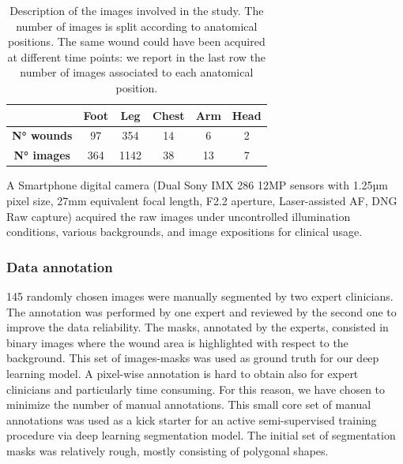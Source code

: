 \documentclass[../main.tex]{subfiles}
\begin{document}
\begin{table}[!ht]
    \centering
    \begin{tabular}{c|c|c|c|c|c|}
  
        \textbf{} & \textbf{Foot} & \textbf{Leg} & \textbf{Chest} & \textbf{Arm} & \textbf{Head} \\ \hline
        \textbf{N° wounds} & 97 & 354 & 14 & 6 & 2 \\ 
        \textbf{N° images} & 364 & 1142 & 38 & 13 & 7 \\ \hline
    \end{tabular}
    \caption{Description of the images involved in the study. The number of images is split according to anatomical positions. The same wound could have been acquired at different time points: we report in the last row the number of images associated to each anatomical position.}
    \label{tab:wounds-deepsk}
\end{table}
A Smartphone digital camera (Dual Sony IMX 286 12MP sensors with 1.25µm pixel size, 27mm equivalent focal length, F2.2 aperture, Laser-assisted AF, DNG Raw capture) acquired the raw images under uncontrolled illumination conditions, various backgrounds, and image expositions for clinical usage.

\subsubsection{Data annotation}
145 randomly chosen images were manually segmented by two expert clinicians.
The annotation was performed by one expert and reviewed by the second one to improve the data reliability.
The masks, annotated by the experts, consisted in binary images where the wound area is highlighted with respect to the background.
This set of images-masks was used as ground truth for our deep learning model. 
A pixel-wise annotation is hard to obtain also for expert clinicians and particularly time consuming.
For this reason, we have chosen to minimize the number of manual annotations.
This small core set of manual annotations was used as a kick starter for an active semi-supervised training procedure via deep learning segmentation model. 
The initial set of segmentation masks was relatively rough, mostly consisting of polygonal shapes. 
\end{document}
